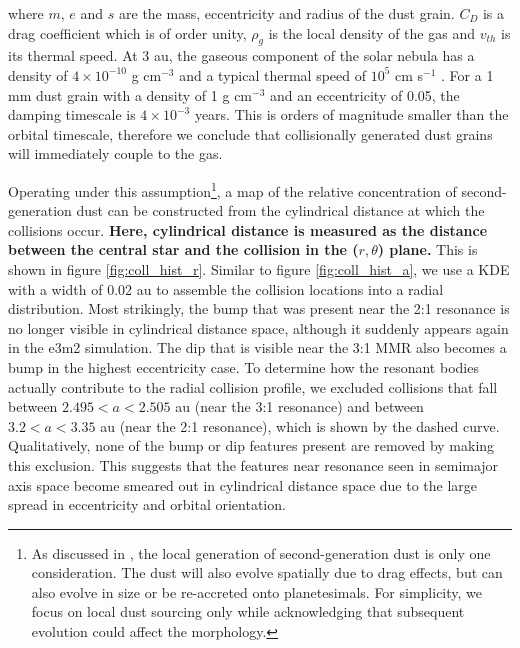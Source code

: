 \documentclass[fleqn,usenatbib]{mnras}
\begin{document}
\noindent where $m$, $e$ and $s$ are the mass, eccentricity and radius of the dust grain. $C_{D}$ is a drag coefficient which is of order unity, $
\rho_{g}$ is the local density of the gas and $v_{th}$ is its thermal speed. At 3 au, the gaseous component of the solar nebula has a density of $4 
\times 10^{-10}$ g cm$^{-3}$ and a typical thermal speed of $10^{5}$ cm s$^{-1}$ \citep{1981PThPS..70...35H}. For a 1 mm dust grain with a 
density of 1 g cm$^{-3}$ and an eccentricity of 0.05, the damping timescale is $4 \times 10^{-3}$ years. This is orders of magnitude smaller than the 
orbital timescale, therefore we conclude that collisionally generated dust grains will immediately couple to the gas.

Operating under this assumption\footnote{As discussed in \cite{2017ApJ...850..103B}, the local generation of second-generation dust is only one 
consideration.  The dust will also evolve spatially due to drag effects, but can also evolve in size or be re-accreted onto planetesimals. For simplicity, 
we focus on local dust sourcing only while acknowledging that subsequent evolution could affect the morphology.}, a map of the relative concentration 
of second-generation dust can be constructed from the cylindrical distance at which the collisions occur. \textbf{Here, cylindrical distance is measured as the distance between the central star and the collision in the ($r, \theta$) plane.} This is shown in figure \ref{fig:coll_hist_r}. 
Similar to figure \ref{fig:coll_hist_a}, we use a KDE with a width of 0.02 au to assemble the collision locations into a radial distribution. Most 
strikingly, the bump that was present near the 2:1 resonance is no longer visible in cylindrical distance space, although it suddenly appears again in 
the e3m2 simulation. The dip that is visible near the 3:1 MMR also becomes a bump in the highest eccentricity case. To determine how the resonant 
bodies actually contribute to the radial collision profile, we excluded collisions that fall between $2.495 < a < 2.505$ au (near the 3:1 resonance) and 
between $3.2 < a < 3.35$ au (near the 2:1 resonance), which is shown by the dashed curve. Qualitatively, none of the bump or dip features present 
are removed by making this exclusion. This suggests that the features near resonance seen in semimajor axis space become smeared out in 
cylindrical distance space due to the large spread in eccentricity and orbital orientation.
\end{document}
